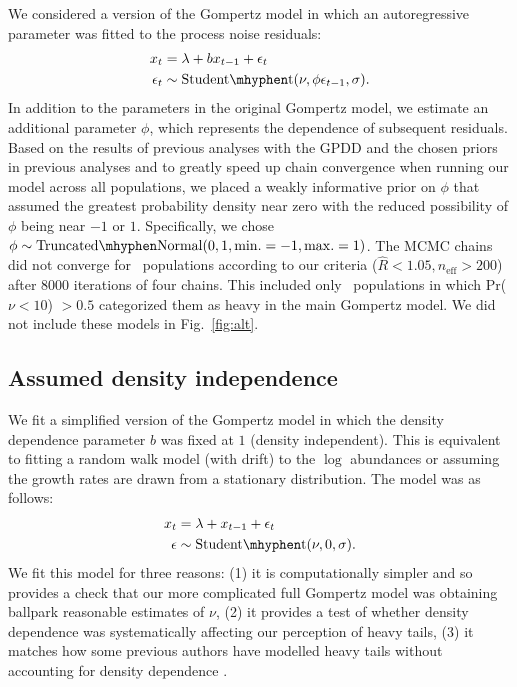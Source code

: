 We considered a version of the Gompertz model in which an autoregressive
parameter was fitted to the process noise residuals:
\begin{align*}
x_t &= \lambda + b x_{t-1} + \epsilon_t\\
\epsilon_t &\sim \mathrm{Student\mhyphen t}(\nu, \phi \epsilon_{t-1}, \sigma).
\end{align*}
In addition to the parameters in the original Gompertz model, we estimate an
additional parameter $\phi$, which represents the dependence of
subsequent residuals. Based on the results of previous analyses with the GPDD
\citep[e.g.][]{connors2014} and the chosen priors in previous analyses
\citep[e.g.][]{thorson2014a} and to greatly speed up chain convergence when
running our model across all populations, we placed a weakly informative prior
on $\phi$ that assumed the greatest probability density near zero with the
reduced possibility of $\phi$ being near $-1$ or $1$. Specifically, we chose
$\phi \sim \mathrm{Truncated\mhyphen Normal}(0, 1, \mathrm{min.} = -1,
\mathrm{max.} = 1)$. The MCMC chains did
not converge for \modelsNoConvergeAROne\ populations according to
our criteria ($\widehat{R} < 1.05, n_\mathrm{eff}
> 200$) after 8000 iterations of four chains. This included only
\modelsNoConvergeAROneHeavyBase\ populations in which
Pr($\nu < 10$) $> 0.5$ categorized them as heavy in the main Gompertz model.
We did not include these models in Fig.~\ref{fig:alt}.

\subsection{Assumed density independence}\label{assumed-density-independence}

We fit a simplified version of the Gompertz model in which the density
dependence parameter $b$ was fixed at $1$ (density independent). This is
equivalent to fitting a random walk model (with drift) to the $\log$ abundances
or assuming the growth rates are drawn from a stationary distribution. The
model was as follows:
\begin{align*}
x_t &= \lambda + x_{t-1} + \epsilon_t\\
\epsilon &\sim \mathrm{Student\mhyphen t}(\nu, 0, \sigma).
\end{align*}
We fit this model for three reasons: (1) it is computationally simpler and so
provides a check that our more complicated full Gompertz model was obtaining
ballpark reasonable estimates of $\nu$, (2) it provides a test of whether
density dependence was systematically affecting our perception of heavy tails,
(3) it matches how some previous authors have modelled heavy tails without
accounting for density dependence \citep{segura2013}.

